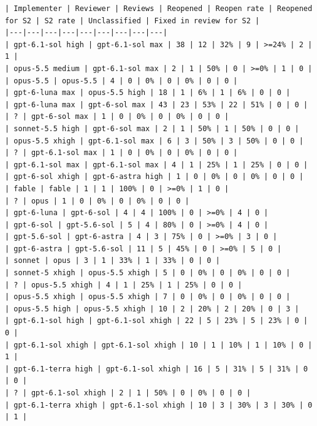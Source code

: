 \documentclass[11pt,a4paper]{article}
\begin{document}
{\begin{verbatim}
| Implementer | Reviewer | Reviews | Reopened | Reopen rate | Reopened for S2 | S2 rate | Unclassified | Fixed in review for S2 |
|---|---|---|---|---|---|---|---|---|
| gpt-6.1-sol high | gpt-6.1-sol max | 38 | 12 | 32% | 9 | >=24% | 2 | 1 |
| opus-5.5 medium | gpt-6.1-sol max | 2 | 1 | 50% | 0 | >=0% | 1 | 0 |
| opus-5.5 | opus-5.5 | 4 | 0 | 0% | 0 | 0% | 0 | 0 |
| gpt-6-luna max | opus-5.5 high | 18 | 1 | 6% | 1 | 6% | 0 | 0 |
| gpt-6-luna max | gpt-6-sol max | 43 | 23 | 53% | 22 | 51% | 0 | 0 |
| ? | gpt-6-sol max | 1 | 0 | 0% | 0 | 0% | 0 | 0 |
| sonnet-5.5 high | gpt-6-sol max | 2 | 1 | 50% | 1 | 50% | 0 | 0 |
| opus-5.5 xhigh | gpt-6.1-sol max | 6 | 3 | 50% | 3 | 50% | 0 | 0 |
| ? | gpt-6.1-sol max | 1 | 0 | 0% | 0 | 0% | 0 | 0 |
| gpt-6.1-sol max | gpt-6.1-sol max | 4 | 1 | 25% | 1 | 25% | 0 | 0 |
| gpt-6-sol xhigh | gpt-6-astra high | 1 | 0 | 0% | 0 | 0% | 0 | 0 |
| fable | fable | 1 | 1 | 100% | 0 | >=0% | 1 | 0 |
| ? | opus | 1 | 0 | 0% | 0 | 0% | 0 | 0 |
| gpt-6-luna | gpt-6-sol | 4 | 4 | 100% | 0 | >=0% | 4 | 0 |
| gpt-6-sol | gpt-5.6-sol | 5 | 4 | 80% | 0 | >=0% | 4 | 0 |
| gpt-5.6-sol | gpt-6-astra | 4 | 3 | 75% | 0 | >=0% | 3 | 0 |
| gpt-6-astra | gpt-5.6-sol | 11 | 5 | 45% | 0 | >=0% | 5 | 0 |
| sonnet | opus | 3 | 1 | 33% | 1 | 33% | 0 | 0 |
| sonnet-5 xhigh | opus-5.5 xhigh | 5 | 0 | 0% | 0 | 0% | 0 | 0 |
| ? | opus-5.5 xhigh | 4 | 1 | 25% | 1 | 25% | 0 | 0 |
| opus-5.5 xhigh | opus-5.5 xhigh | 7 | 0 | 0% | 0 | 0% | 0 | 0 |
| opus-5.5 high | opus-5.5 xhigh | 10 | 2 | 20% | 2 | 20% | 0 | 3 |
| gpt-6.1-sol high | gpt-6.1-sol xhigh | 22 | 5 | 23% | 5 | 23% | 0 | 0 |
| gpt-6.1-sol xhigh | gpt-6.1-sol xhigh | 10 | 1 | 10% | 1 | 10% | 0 | 1 |
| gpt-6.1-terra high | gpt-6.1-sol xhigh | 16 | 5 | 31% | 5 | 31% | 0 | 0 |
| ? | gpt-6.1-sol xhigh | 2 | 1 | 50% | 0 | 0% | 0 | 0 |
| gpt-6.1-terra xhigh | gpt-6.1-sol xhigh | 10 | 3 | 30% | 3 | 30% | 0 | 1 |


\end{verbatim}}
\end{document}
